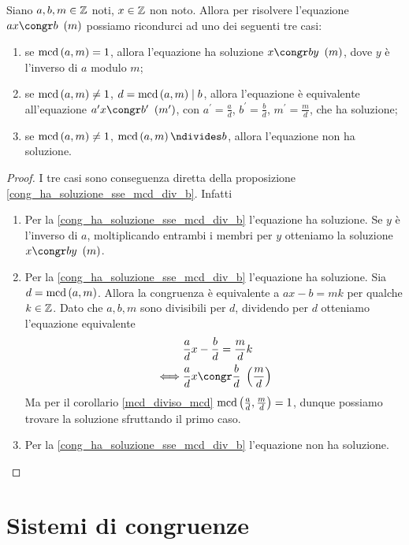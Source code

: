 \begin{proposition}
    Siano $a, b, m \in \mathbb{Z}$ noti, $x \in \mathbb{Z}$ non noto. Allora per risolvere l'equazione $ax \congr b \Mod{m}$ possiamo ricondurci ad uno dei seguenti tre casi:
    \begin{enumerate}
        \item se $\operatorname{mcd}\left(a, m\right) = 1$, allora l'equazione ha soluzione $x \congr by \Mod{m}$, dove $y$ è l'inverso di $a$ modulo $m$;
        \item se $\operatorname{mcd}\left(a, m\right) \neq 1$, $d = \operatorname{mcd}\left(a, m\right) \mid b$, allora l'equazione è equivalente all'equazione $a^\prime x \congr b^\prime \Mod{m^\prime}$, con $a^\prime = \frac{a}{d}$, $b^\prime = \frac{b}{d}$, $m^\prime = \frac{m}{d}$, che ha soluzione;
        \item se $\operatorname{mcd}\left(a, m\right) \neq 1$, $\mcd{a}{m} \ndivides b$, allora l'equazione non ha soluzione.
    \end{enumerate}
\end{proposition}
\begin{proof}
    I tre casi sono conseguenza diretta della proposizione \ref{cong_ha_soluzione_sse_mcd_div_b}. Infatti
    \begin{enumerate}
        \item Per la \ref{cong_ha_soluzione_sse_mcd_div_b} l'equazione ha soluzione. Se $y$ è l'inverso di $a$, moltiplicando entrambi i membri per $y$ otteniamo la soluzione $x \congr by \Mod{m}$.
        \item Per la \ref{cong_ha_soluzione_sse_mcd_div_b} l'equazione ha soluzione. 
        Sia $d = \operatorname{mcd}\left(a, m\right)$. Allora la congruenza è equivalente a $ax - b = mk$ per qualche $k \in \mathbb{Z}$. Dato che $a, b, m$ sono divisibili per $d$, dividendo per $d$ otteniamo l'equazione equivalente
        \begin{alignat*}
            {1}
            &\frac{a}{d}x - \frac{b}{d} = \frac{m}{d}k \\
            \iff &\frac{a}{d}x \congr \frac{b}{d} \Mod{\frac{m}{d}}
        \end{alignat*}
        Ma per il corollario \ref{mcd_diviso_mcd} $\operatorname{mcd}\left(\frac{a}{d}, \frac{m}{d}\right) = 1$, dunque possiamo trovare la soluzione sfruttando il primo caso.
        \item Per la \ref{cong_ha_soluzione_sse_mcd_div_b} l'equazione non ha soluzione. \qedhere
    \end{enumerate}
\end{proof}

\section{Sistemi di congruenze}

